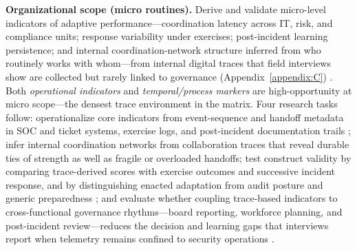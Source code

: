 \textbf{Organizational scope (micro routines).} Derive and validate micro-level indicators of adaptive performance---coordination latency across IT, risk, and compliance units; response variability under exercises; post-incident learning persistence; and internal coordination-network structure inferred from who routinely works with whom---from internal digital traces that field interviews show are collected but rarely linked to governance (Appendix~\ref{appendix:C}) \autocite{barasa2018what}. Both \emph{operational indicators} and \emph{temporal/process markers} are high-opportunity at micro scope---the densest trace environment in the matrix. Four research tasks follow: operationalize core indicators from event-sequence and handoff metadata in SOC and ticket systems, exercise logs, and post-incident documentation trails \autocite{kuypers2018designing,gillard2025quantitative}; infer internal coordination networks from collaboration traces that reveal durable ties of strength as well as fragile or overloaded handoffs; test construct validity by comparing trace-derived scores with exercise outcomes and successive incident response, and by distinguishing enacted adaptation from audit posture and generic preparedness \autocite{westrum2004typology,hepfer2022heterogeneity,boh2023building}; and evaluate whether coupling trace-based indicators to cross-functional governance rhythms---board reporting, workforce planning, and post-incident review---reduces the decision and learning gaps that interviews report when telemetry remains confined to security operations \autocite{francis2014metric}.

